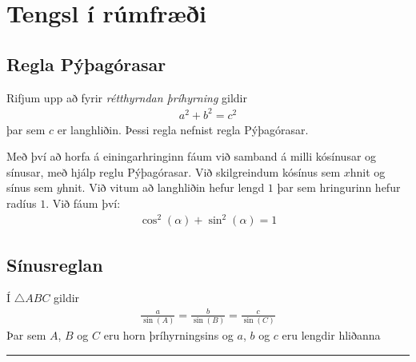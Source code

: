 \documentclass[a4paper,10pt,icelandic]{sphinxmanual}
\begin{document}
\section{Tengsl í rúmfræði}
\label{\detokenize{Kafli07:tengsl-i-rumfraei}}

\subsection{Regla Pýþagórasar}
\label{\detokenize{Kafli07:regla-pyagorasar}}
Rifjum upp að fyrir \textit{rétthyrndan þríhyrning} gildir
\begin{equation*}
\begin{split}a^2+b^2=c^2\end{split}
\end{equation*}
þar sem \(c\) er langhliðin. Þessi regla nefnist regla Pýþagórasar.

Með því að horfa á einingarhringinn fáum við samband á milli kósínusar og sínusar, með hjálp reglu Pýþagórasar. Við skilgreindum kósínus sem \(x\)\sphinxhyphen{}hnit og sínus sem \(y\)\sphinxhyphen{}hnit. Við vitum að langhliðin hefur lengd \(1\) þar sem hringurinn hefur radíus \(1\). Við fáum því:
\begin{equation*}
\begin{split}\cos^2(\alpha)+\sin^2(\alpha)=1\end{split}
\end{equation*}


\subsection{Sínusreglan}
\label{\detokenize{Kafli07:sinusreglan}}
Í \(\triangle ABC\) gildir
\begin{equation*}
\begin{split}\frac{a}{\sin(A)} = \frac{b}{\sin(B)} = \frac{c}{\sin(C)}\end{split}
\end{equation*}
Þar sem \(A\), \(B\) og \(C\) eru horn þríhyrningsins og \(a\), \(b\) og \(c\) eru lengdir hliðanna


\bigskip\hrule\bigskip


\begin{figure}[htbp]
\centering

\noindent{}
\end{figure}
\end{document}
